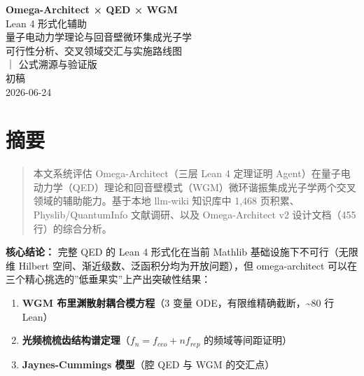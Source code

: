 \documentclass[
  11pt,
  a4paper,
]{ctexrep}
\subtitle{可行性分析、交叉领域交汇与实施路线图 ｜ 公式溯源与验证版}
\author{初稿}
\date{2026-06-24}
\providecommand{\tightlist}{%
  \setlength{\itemsep}{0pt}\setlength{\parskip}{0pt}}
\renewcommand*\contentsname{Table of contents}
\newcommand\contentsname{Table of contents}
\begin{document}
\begin{titlepage}
\vspace*{2cm}
\begin{center}
{\Huge\bfseries Omega-Architect × QED × WGM}\\[0.8em]
{\LARGE Lean 4 形式化辅助}\\[0.4em]
{\LARGE 量子电动力学理论与回音壁微环集成光子学}\\[2.5em]
{\Large 可行性分析、交叉领域交汇与实施路线图}\\[1em]
{\Large ｜ 公式溯源与验证版}\\[4em]
{\large 初稿}\\[1em]
{\large 2026-06-24}
\end{center}
\vfill
\end{titlepage}
\newpage

\renewcommand*\contentsname{目录}
{
\setcounter{tocdepth}{2}
\tableofcontents
}


\chapter*{摘要}\label{ux6458ux8981}


\begin{quote}
本文系统评估 Omega-Architect（三层 Lean 4 定理证明
Agent）在量子电动力学（QED）理论和回音壁模式（WGM）微环谐振集成光子学两个交叉领域的辅助能力。基于本地
llm-wiki 知识库中 1,468 页积累、Physlib/QuantumInfo 文献调研、以及
Omega-Architect v2 设计文档（455 行）的综合分析。
\end{quote}

\textbf{核心结论：} 完整 QED 的 Lean 4 形式化在当前 Mathlib
基础设施下不可行（无限维 Hilbert
空间、渐近级数、泛函积分均为开放问题），但 omega-architect
可以在三个精心挑选的''低垂果实''上产出突破性结果：

\begin{enumerate}
\def\labelenumi{\arabic{enumi}.}
\tightlist
\item
  \textbf{WGM 布里渊散射耦合模方程}（3 变量
  ODE，有限维精确截断，\textasciitilde80 行 Lean）
\item
  \textbf{光频梳梳齿结构谱定理}（\(f_n = f_{ceo} + n f_{rep}\)
  的频域等间距证明）
\item
  \textbf{Jaynes-Cummings 模型}（腔 QED 与 WGM 的交汇点）
\end{enumerate}
\end{document}
